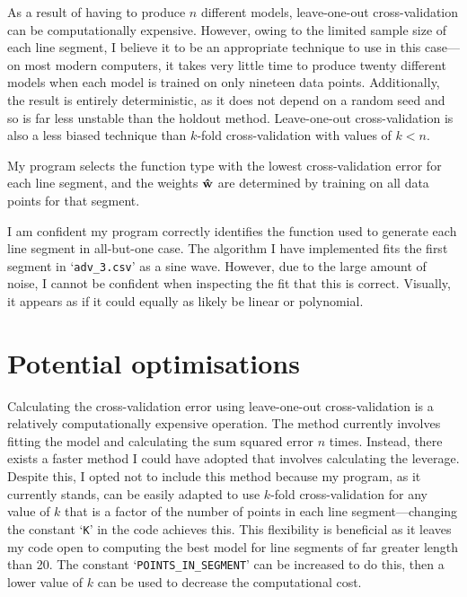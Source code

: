\documentclass[onecolumn, 12pt, a4paper]{article}
\begin{document}
As a result of having to produce $n$ different models,
leave-one-out cross-validation can be computationally expensive.
However, owing to the limited sample size of each line segment,
I believe it to be an appropriate technique to use in this case---on
most modern computers, it takes very little time
to produce twenty different models when each model is trained
on only nineteen data points.
Additionally, the result is entirely deterministic, as it does not depend
on a random seed and so is far less unstable than the holdout method.
Leave-one-out cross-validation is also a less biased technique
than $k$-fold cross-validation with values of $k < n$.

My program selects the function type with the lowest
cross-validation error for each line segment,
and the weights $\vb{\hat{w}}$ are determined by training on all
data points for that segment.

I am confident my program correctly identifies the function used
to generate each line segment in all-but-one case.
The algorithm I have implemented fits the first segment
in `\texttt{adv\_3.csv}' as a sine wave.
However, due to the large amount of noise, I cannot be
confident when inspecting the fit that this is correct.
Visually, it appears as if it could equally as likely
be linear or polynomial.

\section{Potential optimisations}


Calculating the cross-validation error using leave-one-out
cross-validation is a relatively computationally expensive operation.
The method currently involves
fitting the model and calculating the sum squared error
$n$ times. 
Instead, there exists a faster method I could have
adopted that involves calculating the leverage.
Despite this, I opted not to include this method 
because my program, as it currently stands, can be 
easily adapted to use $k$-fold cross-validation for 
any value of $k$ that is a factor of the number of points in each line segment---changing
the constant `\texttt{K}' in the code achieves this.
This flexibility is beneficial as it leaves my code open to
computing the best model for line segments of far greater length than 20.
The constant `\texttt{POINTS\_IN\_SEGMENT}' can be increased to do this,
then a lower value of $k$ can be used to decrease the computational cost.
\end{document}
